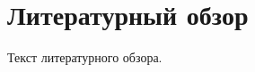 \section{Литературный обзор}

Текст литературного обзора.

\nocite{duportail:alu}
\nocite{althusser:iia}
\nocite{husserl:pd}
\nocite{husserl:sbe}